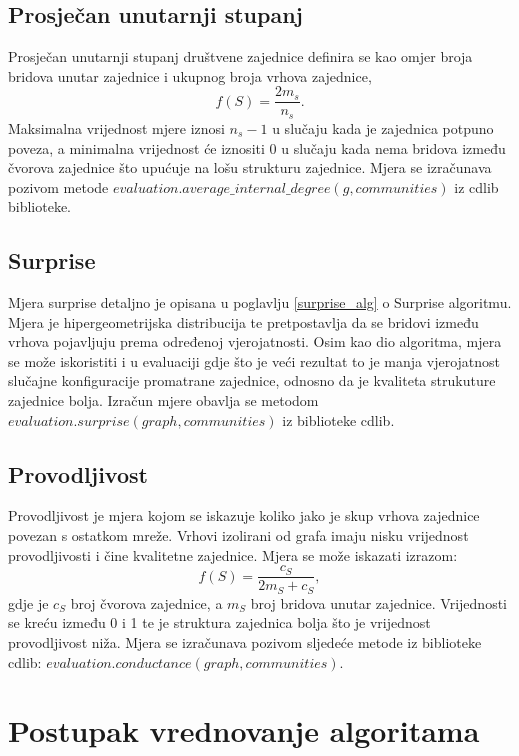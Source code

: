 \pagebreak
\subsection{Prosječan unutarnji stupanj}
Prosječan unutarnji stupanj društvene zajednice definira se kao omjer broja bridova unutar zajednice i ukupnog broja vrhova zajednice,
\begin{equation}
	f(S) =  \frac{2m_{s}}{n_{s}}.
\end{equation}
Maksimalna vrijednost mjere iznosi $n_{s} - 1$ u slučaju kada je zajednica potpuno poveza, a minimalna vrijednost će iznositi 0 u slučaju kada nema bridova između čvorova zajednice što upućuje na lošu strukturu zajednice. Mjera se izračunava pozivom metode $evaluation.average\_internal\_degree(g,communities)$ iz cdlib biblioteke.


\subsection{Surprise}
Mjera surprise detaljno je opisana u poglavlju \ref{surprise_alg} o Surprise algoritmu. Mjera je hipergeometrijska distribucija te pretpostavlja da se bridovi između vrhova pojavljuju prema određenoj vjerojatnosti. Osim kao dio algoritma, mjera se može iskoristiti i u evaluaciji gdje što je veći rezultat to je manja vjerojatnost slučajne konfiguracije promatrane zajednice, odnosno da je kvaliteta strukuture zajednice bolja. Izračun mjere obavlja se metodom $evaluation.surprise(graph, communities)$ iz biblioteke cdlib.


\subsection{Provodljivost}
Provodljivost je mjera kojom se iskazuje koliko jako je skup vrhova zajednice povezan s ostatkom mreže. Vrhovi izolirani od grafa imaju nisku vrijednost provodljivosti i čine kvalitetne zajednice. Mjera se može iskazati izrazom:
\begin{equation}
	f(S) = \frac{c_{S}}{2m_{S} + c_{S}},
\end{equation}
gdje je $c_{S}$ broj čvorova zajednice, a $m_{S}$ broj bridova unutar zajednice. Vrijednosti se kreću između 0 i 1 te je struktura zajednica bolja što je vrijednost provodljivost niža. Mjera se izračunava pozivom sljedeće metode iz biblioteke cdlib: $evaluation.conductance(graph, communities)$.


\pagebreak
\section{Postupak vrednovanje algoritama}
